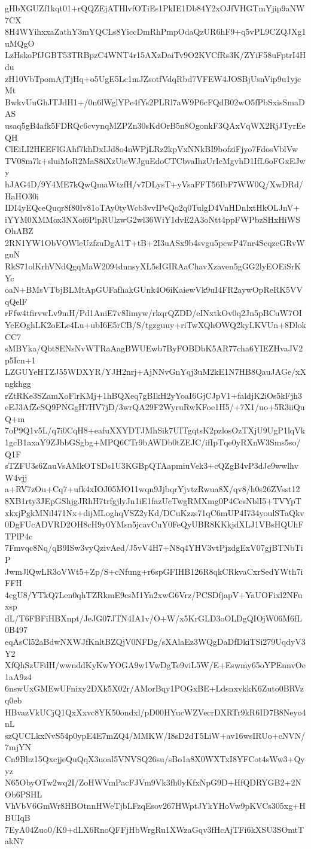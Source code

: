 gHbXGUZf1kqt01+rQQZEjATHlvfOTiEs1PkIE1Db84Y2xOJfVHGTmYjip9aNW7CX
8H4WYihxxaZathY3mYQCLs8YiccDmRhPmpOdaQzUR6hF9+q5vPL9CZQJXg1uMQgO
LzHskoPfJGBT53TRBpzC4WNT4r15AXzDaiTv9O2KVCfRs3K/ZYiF58uFptrI4Hdu
zH10VbTpomAjTjHq+o5UgE5Lc1mJZsotfVdqRbd7VFEW4JOSBjUsnVip9u1yjcMt
BwkvUuGhJTJdH1+/0n6lWglYPe4fYs2PLRl7aW9P6cFQdB02wO5fPbSxisSmaDAS
usaq5gB4afk5FDRQc6cvynqMZPZn30sKdOrB5n8OgonkF3QAxVqWX2RjJTyrEeQH
ClEiLI2HEEFlGAhf7khDxIJd8o4nWPjLRz2kpVxNNkBI9bofziFjyo7FdosVblVw
TV08m7k+sluiMoR2MaS8iXzUieWJguEdoCTCbvaIhzUrIcMgvhD1IfL6oFGxEJwy
hJAG4D/9Y4ME7kQwQmaWtzfH/v7DLysT+yVsaFFT56IbF7WW0Q/XwDRd/HaHO30i
IDI4yEQceQuqr8f80Iv81oTAy0tyWcb3vvIPeQo2q0TulgD4VnHDnlxtHkOLJnV+
iYYM0XMMox3NXoi6PlpRUlzwG2wl36WiY1dvE2A3oNtt4ppFWPbzSHxHiWSOhABZ
2RN1YW1ObVOWleUzfzuDgA1T+tB+2I3uASx9b4svgu5pcwP47nr4ScqzeGRvWgnN
RkS71olKrhVNdQgqMaW2094dnnsyXL5sIGIRAaChavXzaven5gGG2lyEOEiSrKYc
oaN+BMsVTbjBLMtApGUFafhakGUnk4O6iKaiewVk9uI4FR2aywOpReRK5VVqQelF
rFfw4tfirvwLv9mH/Pd1AniE7v8Iimyw/rkqrQZDD/eINxtkOv0q2Jn5pBCuW7OI
YcEOghLK2oELe4Lu+ubI6E5rCB/S/tgzguuy+riTwXQhOWQ2kyLKVUn+8DlokCC7
sMBYka/Qbt8ENsNvWTRaAagBWUEwb7ByFOBDbK5AR77cha6YIEZHvaJV2p5Icn+1
LZGUYeHTZJ55WDXYR/YJH2nrj+AjNNvGnYqj3uM2kE1N7HB8QauJAGe/xXngkhgg
rZtRKe3SZamXoFlrKMj+1hBQXeq7gBIkH2yYoaI6GjCJpV1+faldjK2iOs5kFjh3
eEJ3AfZcSQ9PNGgH7HV7jD/3wrQA29F2WyruRwKFoe1H5/+7X1/uo+5R3iiQuQ+m
7oP9Q1v5L/q7i0CqH8+eafuXXYDTJMhSik7UITgqtsK2pzlosOzTXjU9UgP1lqVk
1gcB1axaY9ZJbbGSgbg+MPQ6CTr9bAWDb0tZEJC/ifIpTqe0yRXnW3Sms5so/Q1F
sTZFU3s6ZauVsAMkOTSDs1U3KGBpQTAapmiuVek3+cQZgB4vP3dJe9wwlhvW4vjj
a+RV7zOu+Cq7+ufk4xIOJ05MO11wqn9JjbqrYjvtzRwua8X/qv8/h0s26ZVsst12
8XB1rty3JEpGShjgJRhH7trfgjlyJn1iE1fazUcTwgRMXmg0P4CesNblI5+TVYpT
xkxjPgkMNil471Nx+dijMLoghqVSZ2yKd/DCuKzzs71qC6mUP4I734youlSTaQkv
0DgFUcADVRD2OH8cH9y0YMsn5jcavCuY0FeQyUBR8KKkjdXLJ1VBsHQUhFTPlP4c
7Fmvqc8Nq/qB9ISw3vyQzivAed/J5vV4H7+N8q4YHV3vtPjzdgExV07gjBTNbTiP
JwmJlQwLR3oVWt5+Zp/S+cNfung+r6spGFIHB126R8qkCRkvaCxrSedYWth7iFFH
4cgU8/YTkQ7Len0qhTZRkmE9csM1Yn2xwG6Vrz/PCSDfjapV+YaUOFixl2NFuxsp
dL/T6FBFiHBXnpt/JeJG07JTN4IA1v/O+W/x5KrGLD3oOLDgQIOjW06M6fL0B497
eqAsCl52aBdwNXWJfKnltBZQjV0NFDg/sXAlaEz3WQgDaDfDkiTSi279UqdyV3Y2
XfQhSzUFdH/wwnddKyKwYOGA9w1VwDgTe9viL5W/E+Eswmy65oYPEnnvOe1aA9z4
6nswUxGMEwUFnixy2DXk5X02r/AMorBqy1POGxBE+LdsnxvkkK6Zuto0BRVzq0eb
HBvazVkUCjQ1QxXxvc8YK50ondxl/pD00HYucWZVecrDXRTr9kR6ID7B8Neyo4nL
szQUCLkxNvS54p0ypE4E7mZQ4/MMKW/I8sD2dT5LiW+av16wsIRUo+cNVN/7mjYN
Cn9Bhz15QxcjjeQuQqX3uoal5VNVSQ26su/sBo1a8X0WXTxI8YFCot4sWw3+Qyyz
N65ObyOTw2wq2I/ZoHWVmPacFJVm9Vk3fh0yKfxNpG9D+HfQDRYGB2+2NOb6PSHL
VhVbV6GmWr8HBOtnnHWeTjbLFzqEsov267HWptJYkYHoVw9pKVCs305xg+HBUIqB
7EyA04Zuo0/K9+dLX6RnoQFFjHbWrgRu1XWzaGqv3fHcAjTFi6kXSU3SOmtTakN7
